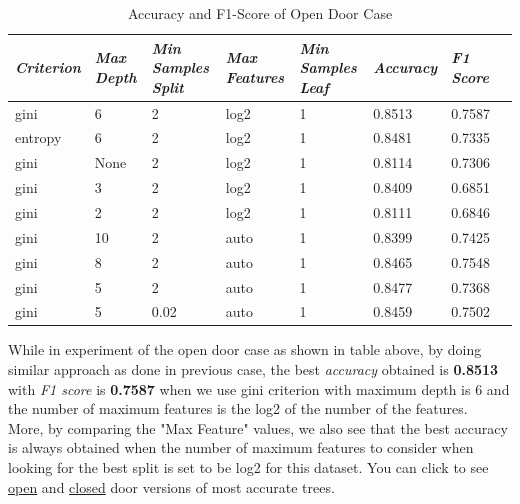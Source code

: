 \documentclass[conference]{IEEEtran}
\begin{document}
\begin{table}[H]
	\centering
	\caption{Accuracy and F1-Score of Open Door Case}
	\label{AllArches7}
	\begin{tabular}{|p{1cm}|p{0.7cm}|p{0.7cm}|p{0.7cm}|p{1cm}|p{1cm}|p{1cm}|p{1cm}|}
	    \hline
		\textit{Criterion} 
		& \textit{Max Depth}
		& \textit{Min Samples Split}
		& \textit{Max Features}
		& \textit{Min Samples Leaf}
		& \textit{Accuracy}
		& \textit{F1 Score}\\ \hline
		gini & 6 & 2 & log2 & 1 & \cellcolor{green!25}0.8513 & \cellcolor{green!25}0.7587\\ \hline
		entropy & 6 & 2 & log2 & 1 & 0.8481 & 0.7335\\ \hline
		gini & None & 2 & log2 & 1 & 0.8114 & 0.7306\\ \hline
		gini & 3 & 2 & log2 & 1 & 0.8409 & 0.6851\\ \hline
		gini & 2 & 2 & log2 & 1 & 0.8111 & 0.6846\\ \hline
		gini & 10 & 2 & auto & 1 & 0.8399 & 0.7425\\ \hline
		gini & 8 & 2 & auto & 1 & 0.8465 & 0.7548\\ \hline
		gini & 5 & 2 & auto & 1 & 0.8477 & 0.7368\\ \hline
		gini & 5 & 0.02 & auto & 1 & 0.8459 & 0.7502\\ \hline
	\end{tabular}
\end{table}

While in experiment of the open door case as shown in table above, by doing similar approach as done in previous case, the best \textit{accuracy} obtained is \textbf{0.8513} with \textit{F1 score} is \textbf{0.7587} when we use gini criterion with maximum depth is 6 and the number of maximum features is the log2 of the number of the features.\\

More, by comparing the "Max Feature" values, we also see that the best accuracy is always obtained when the number of maximum features to consider when looking for the best split is set to be log2 for this dataset. You can click to see \href{https://github.com/robofoxy/Energy-Efficient-Smart-Buildings-by-Occupancy-Prediction/blob/master/docs/treeOPENMAX85131255125.png}{open} and \href{https://github.com/robofoxy/Energy-Efficient-Smart-Buildings-by-Occupancy-Prediction/blob/master/docs/tree9365853658536586.png}{closed} door versions of most accurate trees.
\end{document}
